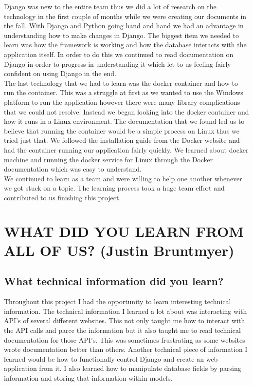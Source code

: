 \documentclass[draftclsnofoot,10pt,onecolumn]{IEEEtran} %
\begin{document}
Django was new to the entire team thus we did a lot of research on the
technology in the first couple of months while we were creating our documents in
the fall. With Django and Python going hand and hand we had an advantage in
understanding how to make changes in Django. The biggest item we needed to learn
was how the framework is working and how the database interacts with the
application itself. In order to do this we continued to read documentation on
Django in order to progress in understanding it which let to us feeling fairly
confident on using Django in the end. \\

The last technology that we had to learn was the docker container and how to run
the container. This was a struggle at first as we wanted to use the Windows
platform to run the application however there were many library complications
that we could not resolve. Instead we began looking into the docker container
and how it runs in a Linux environment. The documentation that we found led us
to believe that running the container would be a simple process on Linux thus we
tried just that. We followed the installation guide from the Docker website and
had the container running our application fairly quickly. We learned about
docker machine and running the docker service for Linux through the Docker
documentation which was easy to understand. \\

We continued to learn as a team and were willing to help one another whenever we
got stuck on a topic. The learning process took a huge team effort and
contributed to us finishing this project. \\



\section{WHAT DID YOU LEARN FROM ALL OF US? (Justin Bruntmyer)}

\subsection{What technical information did you learn?}
Throughout this project I had the opportunity to learn interesting technical
information. The technical information I learned a lot about was interacting
with API's of several different websites. This not only taught me how to
interact with the API calls and parce the information but it also taught me to
read technical documentation for those API's. This was sometimes frustrating as
some websites wrote documentation better than others. Another technical piece of
information I learned would be how to functionally control Django and create an
web application from it. I also learned how to manipulate database fields by
parsing information and storing that information within models. \\
\end{document}
